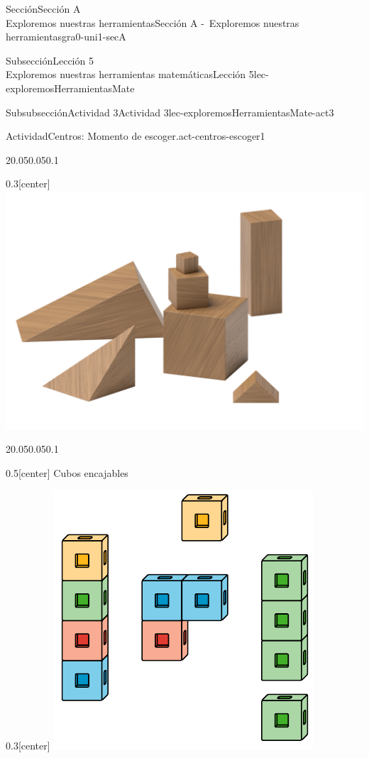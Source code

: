 \begin{sectionptx}{Sección}{{\Large Sección A\\}Exploremos nuestras herramientas}{}{Sección A -~Exploremos nuestras herramientas}{}{}{gra0-uni1-secA}
\begin{subsectionptx}{Subsección}{{\normalsize Lección 5\\[-0.05cm]}Exploremos nuestras herramientas matemáticas}{}{Lección 5}{}{}{lec-exploremosHerramientasMate}
\begin{subsubsectionptx}{Subsubsección}{Actividad 3}{}{Actividad 3}{}{}{lec-exploremosHerramientasMate-act3}
\begin{activity}{Actividad}{Centros: Momento de escoger.}{act-centros-escoger1}
\begin{sidebyside}{2}{0.05}{0.05}{0.1}
\begin{sbspanel}{0.3}[center]
\includegraphics[max width=\linewidth, center]{external/png-source/K.1.A Beta Student Workbook.Geoblocks.png}
\end{sbspanel}%
\end{sidebyside}%
\begin{sidebyside}{2}{0.05}{0.05}{0.1}%
\begin{sbspanel}{0.5}[center]%
Cubos encajables%
\end{sbspanel}%
\begin{sbspanel}{0.3}[center]%
\includegraphics[max width=\linewidth, center]{external/svg-source/tikz-file-128850.pdf}

\end{sbspanel}
\end{sidebyside}
\end{activity}
\end{subsubsectionptx}
\end{subsectionptx}
\end{sectionptx}

